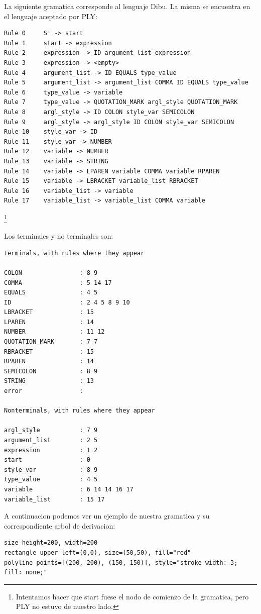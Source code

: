 \documentclass{article}
\theoremstyle{definition}
\theoremstyle{remark}
\begin{document}
La siguiente gramatica corresponde al lenguaje Dibu. La misma se encuentra en el lenguaje aceptado por PLY:

\begin{verbatim}
Rule 0     S' -> start
Rule 1     start -> expression
Rule 2     expression -> ID argument_list expression
Rule 3     expression -> <empty>
Rule 4     argument_list -> ID EQUALS type_value
Rule 5     argument_list -> argument_list COMMA ID EQUALS type_value
Rule 6     type_value -> variable
Rule 7     type_value -> QUOTATION_MARK argl_style QUOTATION_MARK
Rule 8     argl_style -> ID COLON style_var SEMICOLON
Rule 9     argl_style -> argl_style ID COLON style_var SEMICOLON
Rule 10    style_var -> ID
Rule 11    style_var -> NUMBER
Rule 12    variable -> NUMBER
Rule 13    variable -> STRING
Rule 14    variable -> LPAREN variable COMMA variable RPAREN
Rule 15    variable -> LBRACKET variable_list RBRACKET
Rule 16    variable_list -> variable
Rule 17    variable_list -> variable_list COMMA variable
\end{verbatim}
\footnote{Intentamos hacer que start fuese el nodo de comienzo de la gramatica, pero PLY no estuvo de nuestro lado.}

\pagebreak

Los terminales y no terminales son:

\begin{verbatim}
Terminals, with rules where they appear

COLON                : 8 9
COMMA                : 5 14 17
EQUALS               : 4 5
ID                   : 2 4 5 8 9 10
LBRACKET             : 15
LPAREN               : 14
NUMBER               : 11 12
QUOTATION_MARK       : 7 7
RBRACKET             : 15
RPAREN               : 14
SEMICOLON            : 8 9
STRING               : 13
error                : 

Nonterminals, with rules where they appear

argl_style           : 7 9
argument_list        : 2 5
expression           : 1 2
start                : 0
style_var            : 8 9
type_value           : 4 5
variable             : 6 14 14 16 17
variable_list        : 15 17
\end{verbatim}

A continuacion podemos ver un ejemplo de nuestra gramatica y su correspondiente arbol de derivacion:

\begin{verbatim}
size height=200, width=200
rectangle upper_left=(0,0), size=(50,50), fill="red"
polyline points=[(200, 200), (150, 150)], style="stroke-width: 3; fill: none;"
\end{verbatim}
\end{document}
